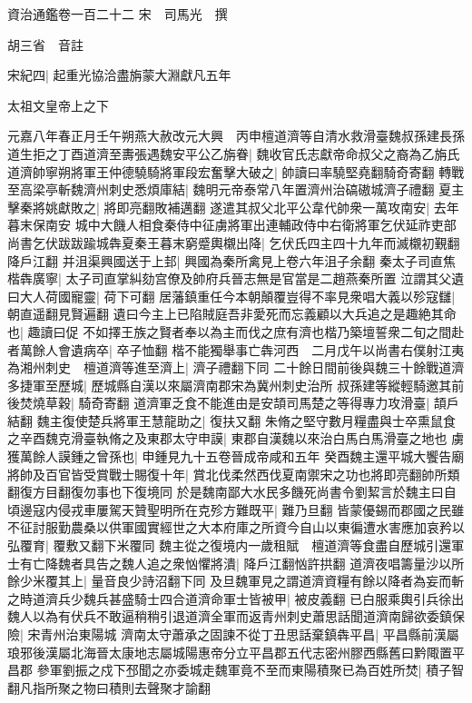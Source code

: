 資治通鑑卷一百二十二
宋　司馬光　撰

胡三省　音註

宋紀四|{
	起重光協洽盡旃蒙大淵獻凡五年}


太祖文皇帝上之下

元嘉八年春正月壬午朔燕大赦改元大興　丙申檀道濟等自清水救滑臺魏叔孫建長孫道生拒之丁酉道濟至夀張遇魏安平公乙旃眷|{
	魏收官氏志獻帝命叔父之裔為乙旃氏}
道濟帥寧朔將軍王仲德驍騎將軍段宏奮擊大破之|{
	帥讀曰率驍堅堯翻騎奇寄翻}
轉戰至高梁亭斬魏濟州刺史悉煩庫結|{
	魏明元帝泰常八年置濟州治碻磝城濟子禮翻}
夏主擊秦將姚獻敗之|{
	將即亮翻敗補邁翻}
遂遣其叔父北平公韋代帥衆一萬攻南安|{
	去年暮末保南安}
城中大饑人相食秦侍中征虜將軍出連輔政侍中右衛將軍乞伏延祚吏部尚書乞伏跋跋踰城犇夏秦王暮末窮蹙輿櫬出降|{
	乞伏氏四主四十九年而滅櫬初覲翻降戶江翻}
并沮渠興國送于上邽|{
	興國為秦所禽見上卷六年沮子余翻}
秦太子司直焦楷犇廣寧|{
	太子司直掌糾劾宫僚及帥府兵晉志無是官當是二趙燕秦所置}
泣謂其父遺曰大人荷國寵靈|{
	荷下可翻}
居藩鎮重任今本朝顛覆豈得不率見衆唱大義以殄寇讎|{
	朝直遥翻見賢遍翻}
遺曰今主上已陷賊庭吾非愛死而忘義顧以大兵追之是趣絶其命也|{
	趣讀曰促}
不如擇王族之賢者奉以為主而伐之庶有濟也楷乃築壇誓衆二旬之間赴者萬餘人會遺病卒|{
	卒子恤翻}
楷不能獨舉事亡犇河西　二月戊午以尚書右僕射江夷為湘州刺史　檀道濟等進至濟上|{
	濟子禮翻下同}
二十餘日間前後與魏三十餘戰道濟多捷軍至歷城|{
	歷城縣自漢以來屬濟南郡宋為冀州刺史治所}
叔孫建等縱輕騎邀其前後焚燒草穀|{
	騎奇寄翻}
道濟軍乏食不能進由是安頡司馬楚之等得專力攻滑臺|{
	頡戶結翻}
魏主復使楚兵將軍王慧龍助之|{
	復扶又翻}
朱脩之堅守數月糧盡與士卒熏鼠食之辛酉魏克滑臺執脩之及東郡太守申謨|{
	東郡自漢魏以來治白馬白馬滑臺之地也}
虜獲萬餘人謨鍾之曾孫也|{
	申鍾見九十五卷晉成帝咸和五年}
癸酉魏主還平城大饗告廟將帥及百官皆受賞戰士賜復十年|{
	賞北伐柔然西伐夏南禦宋之功也將即亮翻帥所類翻復方目翻復勿事也下復境同}
於是魏南鄙大水民多饑死尚書令劉絜言於魏主曰自頃邊寇内侵戎車屢駕天贊聖明所在克殄方難既平|{
	難乃旦翻}
皆蒙優錫而郡國之民雖不征討服勤農桑以供軍國實經世之大本府庫之所資今自山以東徧遭水害應加哀矜以弘覆育|{
	覆敷又翻下米覆同}
魏主從之復境内一歲租賦　檀道濟等食盡自歷城引還軍士有亡降魏者具告之魏人追之衆忷懼將潰|{
	降戶江翻忷許拱翻}
道濟夜唱籌量沙以所餘少米覆其上|{
	量音良少詩沼翻下同}
及旦魏軍見之謂道濟資糧有餘以降者為妄而斬之時道濟兵少魏兵甚盛騎士四合道濟命軍士皆被甲|{
	被皮義翻}
已白服乘輿引兵徐出魏人以為有伏兵不敢逼稍稍引退道濟全軍而返青州刺史蕭思話聞道濟南歸欲委鎮保險|{
	宋青州治東陽城}
濟南太守蕭承之固諫不從丁丑思話棄鎮犇平昌|{
	平昌縣前漢屬琅邪後漢屬北海晉太康地志屬城陽惠帝分立平昌郡五代志密州膠西縣舊曰黔陬置平昌郡}
參軍劉振之戍下邳聞之亦委城走魏軍竟不至而東陽積聚已為百姓所焚|{
	積子智翻凡指所聚之物曰積則去聲聚才諭翻}
